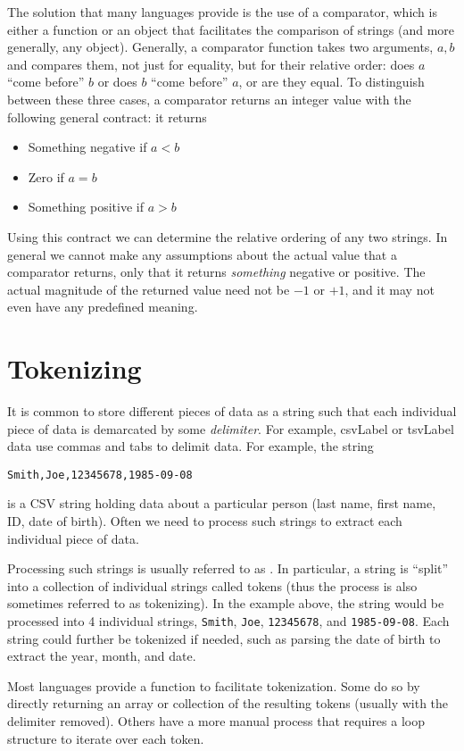 The solution that many languages provide is the use of a 
\gls{comparator}, which is either a function or an object that
facilitates the comparison of strings (and more generally, any object).
Generally, a comparator function takes two arguments, $a, b$
and compares them, not just for equality, but for their relative
order: does $a$ ``come before'' $b$ or does $b$ ``come before''
$a$, or are they equal.  To distinguish between these three
cases, a comparator returns an integer value with the following
general contract: it returns
\begin{itemize}
  \item Something negative if $a < b$
  \item Zero if $a = b$
  \item Something positive if $a > b$
\end{itemize}
Using this contract we can determine the relative ordering of
any two strings.  In general we cannot make any assumptions
about the actual value that a comparator returns, only that it
returns \emph{something} negative or positive.  The actual
magnitude of the returned value need not be $-1$ or $+1$, 
and it may not even have any predefined meaning.

\section{Tokenizing}

It is common to store different pieces of data as a string such
that each individual piece of data is demarcated by some 
\emph{delimiter}.  For example, \gls{csvLabel} or \gls{tsvLabel}
data use commas and tabs to delimit data.  For example, the
string 

\texttt{Smith,Joe,12345678,1985-09-08}

is a CSV string holding data about a particular person (last name, 
first name, ID, date of birth).  Often we need to process such
strings to extract each individual piece of data.

Processing such strings is usually referred to as  
.
In particular, a string is ``split'' into a collection of individual
strings called \glspl{token} (thus the process is also sometimes
referred to as tokenizing).  In the example above, the
string would be processed into 4 individual strings, 
\texttt{Smith}, \texttt{Joe}, \texttt{12345678},
and \texttt{1985-09-08}.  Each string could further
be tokenized if needed, such as parsing the date of birth
to extract the year, month, and date.

Most languages provide a function to facilitate tokenization.  Some
do so by directly returning an array or collection of the resulting
tokens (usually with the delimiter removed).  Others have a
more manual process that requires a loop structure to iterate
over each token.
